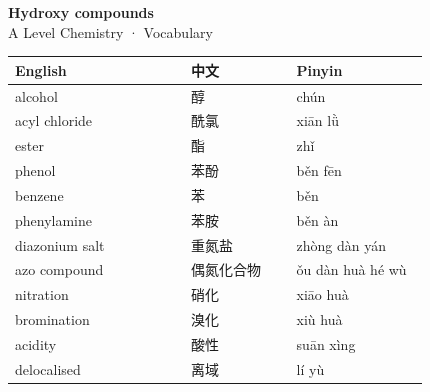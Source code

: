 \documentclass[11pt]{article}
\begin{document}
\begin{center}
  {\LARGE\bfseries Hydroxy compounds}\\[0.35em]
  {\large A Level Chemistry · Vocabulary}
\end{center}
\vspace{0.6em}

\begin{longtable}{@{}p{0.40\linewidth}p{0.24\linewidth}p{0.30\linewidth}@{}}
\toprule
\textbf{English} & \textbf{中文} & \textbf{Pinyin} \\
\midrule
\endhead
\bottomrule
\endlastfoot
alcohol & 醇 & chún \\
acyl chloride & 酰氯 & xiān lǜ \\
ester & 酯 & zhǐ \\
phenol & 苯酚 & běn fēn \\
benzene & 苯 & běn \\
phenylamine & 苯胺 & běn àn \\
diazonium salt & 重氮盐 & zhòng dàn yán \\
azo compound & 偶氮化合物 & ǒu dàn huà hé wù \\
nitration & 硝化 & xiāo huà \\
bromination & 溴化 & xiù huà \\
acidity & 酸性 & suān xìng \\
delocalised & 离域 & lí yù \\
\end{longtable}
\end{document}
